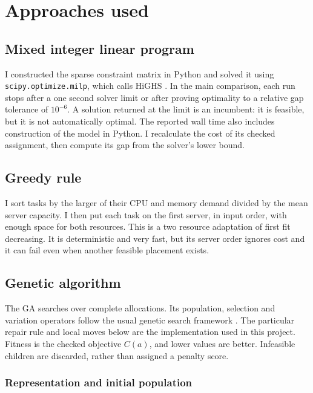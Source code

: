 \documentclass[10pt,a4paper]{article}
\begin{document}
\section{Approaches used}

\subsection{Mixed integer linear program}

I constructed the sparse constraint matrix in Python and solved it using
\texttt{scipy.optimize.milp}, which calls HiGHS \cite{scipymilp,highs}. In the
main comparison, each run stops after a one second solver limit or after proving
optimality to a relative gap tolerance of $10^{-6}$. A solution returned at the
limit is an incumbent: it is feasible, but it is not automatically optimal. The
reported wall time also includes construction of the model in Python. I
recalculate the cost of its checked assignment, then compute its gap from the
solver's lower bound.

\subsection{Greedy rule}

I sort tasks by the larger of their CPU and memory demand divided by the mean
server capacity. I then put each task on the first server, in input order, with
enough space for both resources. This is a two resource adaptation of first fit
decreasing. It is deterministic and very fast, but its server order ignores cost
and it can fail even when another feasible placement exists.

\subsection{Genetic algorithm}

The GA searches over complete allocations. Its population, selection and
variation operators follow the usual genetic search framework
\cite{holland1992,whitley1994}. The particular repair rule and local moves below
are the implementation used in this project. Fitness is the checked objective
$C(a)$, and lower values are better. Infeasible children are discarded, rather
than assigned a penalty score.

\subsubsection{Representation and initial population}
\end{document}
